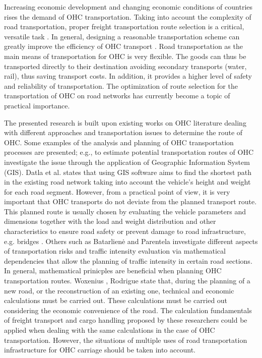%

Increasing economic development and changing economic conditions of countries rises the demand of OHC transportation. Taking into account the complexity of road transportation, proper freight transportation route selection is a critical, versatile task \cite{Bazaras.2013, xu2001methodology, sivilevicius2007dynamics}. In general, designing a reasonable transportation scheme can greatly improve the efficiency of OHC transport \cite{meng2015optimized}. Road transportation as the main means of transportation for OHC is very flexible. The goods can thus be transported directly to their destination avoiding secondary transports (water, rail), thus saving transport costs. In addition, it provides a higher level of safety and reliability of transportation. The optimization of route selection for the transportation of OHC on road networks has currently become a topic of practical importance\cite{geisberger2011efficient}.
\par The presented research is built upon existing works on OHC literature dealing with different approaches and transportation issues to determine the route of OHC. Some examples of the analysis and planning of OHC transportation processes are presented; e.g., to estimate potential transportation routes of OHC \cite{durham2002gis} investigate the issue through the application of Geographic Information System (GIS). Datla et al. \cite{datla2004gis} states that using GIS software aims to find the shortest path in the existing road network taking into account the vehicle’s height and weight for each road segment. However, from a practical point of view, it is very important that OHC transports do not deviate from the planned transport route. This planned route is usually chosen by evaluating the vehicle parameters and dimensions together with the load and weight distribution and other characteristics to ensure road safety or prevent damage to road infrastructure, e.g. bridges \cite{ecmt2006improving, vaitkus2016effect, kombe2017modelling, pauer2017development}.
Others such as Batarlienė \cite{batarliene2007mobile} and Parentela \cite{parentela2002risk} investigate different aspects of transportation risks and traffic intensity evaluation via mathematical dependencies that allow the planning of traffic intensity in certain road sections. In general, mathematical prinicples are beneficial when planning OHC transportation routes. 
Woxenius \cite{woxenius2002organisation, woxenius2002conceptual}, Rodrigue \cite{rodrigue2020geography} state that, during the planning of a new road, or the reconstruction of an existing one, technical and economic calculations must be carried out. These calculations must be carried out considering the economic convenience of the road. 
The calculation fundamentals of freight transport and cargo handling proposed by these researchers could be applied when dealing with the same calculations in the case of OHC transportation. However, the situations of multiple uses of road transportation infrastructure for OHC carriage should be taken into account. 

